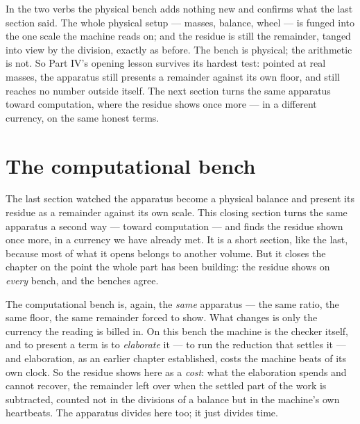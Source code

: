 In the two verbs the physical bench adds nothing new and confirms what the last section said. The whole physical setup
--- masses, balance, wheel --- is funged into the one scale the machine reads on; and the residue is still the
remainder, tanged into view by the division, exactly as before. The bench is physical; the arithmetic is not. So Part
IV's opening lesson survives its hardest test: pointed at real masses, the apparatus still presents a remainder against
its own floor, and still reaches no number outside itself. The next section turns the same apparatus toward
computation, where the residue shows once more --- in a different currency, on the same honest terms.

\section{The computational bench}

The last section watched the apparatus become a physical balance and present its residue as a remainder against its own
scale. This closing section turns the same apparatus a second way --- toward computation --- and finds the residue
shown once more, in a currency we have already met. It is a short section, like the last, because most of what it opens
belongs to another volume. But it closes the chapter on the point the whole part has been building: the residue shows
on \emph{every} bench, and the benches agree.

The computational bench is, again, the \emph{same} apparatus --- the same ratio, the same floor, the same remainder
forced to show. What changes is only the currency the reading is billed in. On this bench the machine is the checker
itself, and to present a term is to \emph{elaborate} it --- to run the reduction that settles it --- and elaboration,
as an earlier chapter established, costs the machine beats of its own clock. So the residue shows here as a \emph{cost}:
what the elaboration spends and cannot recover, the remainder left over when the settled part of the work is
subtracted, counted not in the divisions of a balance but in the machine's own heartbeats. The apparatus divides here
too; it just divides time.

